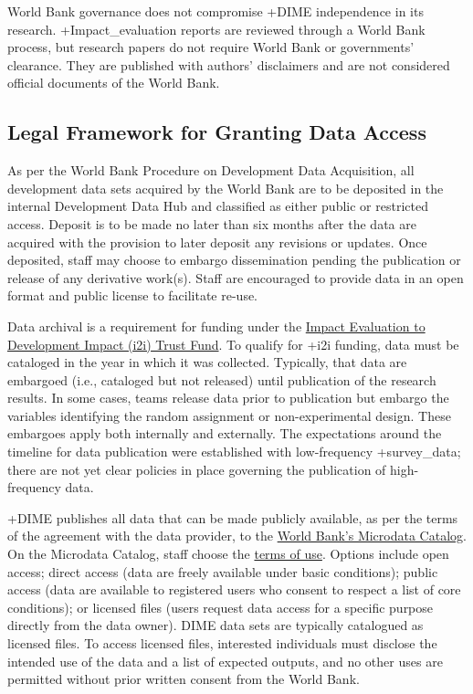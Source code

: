 \documentclass[
]{book}
\begin{document}
World Bank governance does not compromise +DIME\textbar{} independence in its research. +Impact\_evaluation\textbar{} reports are reviewed through a World Bank process, but research papers do not require World Bank or governments' clearance. They are published with authors' disclaimers and are not considered official documents of the World Bank.

\hypertarget{legal-framework-for-granting-data-access-7}{%
\subsection{Legal Framework for Granting Data Access}\label{legal-framework-for-granting-data-access-7}}

As per the World Bank Procedure on Development Data Acquisition, all development data sets acquired by the World Bank are to be deposited in the internal Development Data Hub and classified as either public or restricted access. Deposit is to be made no later than six months after the data are acquired with the provision to later deposit any revisions or updates. Once deposited, staff may choose to embargo dissemination pending the publication or release of any derivative work(s). Staff are encouraged to provide data in an open format and public license to facilitate re-use.

Data archival is a requirement for funding under the \href{https://www.worldbank.org/en/research/dime/brief/i2i-fund}{Impact Evaluation to Development Impact (i2i) Trust Fund}. To qualify for +i2i\textbar{} funding, data must be cataloged in the year in which it was collected. Typically, that data are embargoed (i.e., cataloged but not released) until publication of the research results. In some cases, teams release data prior to publication but embargo the variables identifying the random assignment or non-experimental design. These embargoes apply both internally and externally. The expectations around the timeline for data publication were established with low-frequency +survey\_data\textbar; there are not yet clear policies in place governing the publication of high-frequency data.

+DIME\textbar{} publishes all data that can be made publicly available, as per the terms of the agreement with the data provider, to the \href{https://microdata.worldbank.org/index.php/home}{World Bank's Microdata Catalog}. On the Microdata Catalog, staff choose the \href{https://microdata.worldbank.org/index.php/terms-of-use}{terms of use}. Options include open access; direct access (data are freely available under basic conditions); public access (data are available to registered users who consent to respect a list of core conditions); or licensed files (users request data access for a specific purpose directly from the data owner). DIME data sets are typically catalogued as licensed files. To access licensed files, interested individuals must disclose the intended use of the data and a list of expected outputs, and no other uses are permitted without prior written consent from the World Bank.
\end{document}
